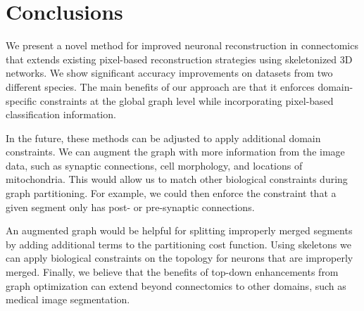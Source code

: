 \section{Conclusions}

We present a novel method for improved neuronal reconstruction in connectomics that extends existing pixel-based reconstruction strategies using skeletonized 3D networks. 
We show significant accuracy improvements on datasets from two different species. 
The main benefits of our approach are that it enforces domain-specific constraints at the global graph level while incorporating pixel-based classification information.

In the future, these methods can be adjusted to apply additional domain constraints. 
We can augment the graph with more information from the image data, such as synaptic connections, cell morphology, and locations of mitochondria. 
This would allow us to match other biological constraints during graph partitioning. 
For example, we could then enforce the constraint that a given segment only has post- or pre-synaptic connections. 

An augmented graph would be helpful for splitting improperly merged segments by adding additional terms to the partitioning cost function. 
Using skeletons we can apply biological constraints on the topology for neurons that are improperly merged.
Finally, we believe that the benefits of top-down enhancements from graph optimization can extend beyond connectomics to other domains, such as medical image segmentation.